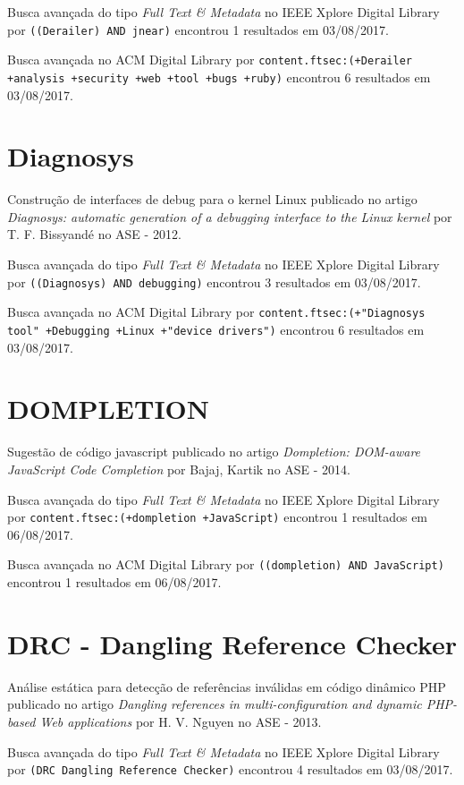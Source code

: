 Busca avançada do tipo {\it Full Text \& Metadata} no IEEE Xplore Digital Library por
\texttt{((Derailer) AND jnear)}
encontrou
1 resultados em
03/08/2017.

Busca avançada no ACM Digital Library por
\texttt{content.ftsec:(+Derailer +analysis +security +web +tool +bugs +ruby)}
encontrou
6 resultados em
03/08/2017.

\section{Diagnosys}

Construção de interfaces de debug para o kernel Linux
publicado no artigo
{\it Diagnosys: automatic generation of a debugging interface to the Linux kernel}
por
T. F. Bissyandé
no
ASE
-
2012.

Busca avançada do tipo {\it Full Text \& Metadata} no IEEE Xplore Digital Library por
\texttt{((Diagnosys) AND debugging)}
encontrou
3 resultados em
03/08/2017.

Busca avançada no ACM Digital Library por
\texttt{content.ftsec:(+"Diagnosys tool" +Debugging +Linux +"device drivers")}
encontrou
6 resultados em
03/08/2017.

\section{DOMPLETION}

Sugestão de código javascript
publicado no artigo
{\it Dompletion: DOM-aware JavaScript Code Completion}
por
Bajaj, Kartik
no
ASE
-
2014.

Busca avançada do tipo {\it Full Text \& Metadata} no IEEE Xplore Digital Library por
\texttt{content.ftsec:(+dompletion +JavaScript)}
encontrou
1 resultados em
06/08/2017.

Busca avançada no ACM Digital Library por
\texttt{((dompletion) AND JavaScript)}
encontrou
1 resultados em
06/08/2017.

\section{DRC - Dangling Reference Checker}

Análise estática para detecção de referências inválidas em código dinâmico PHP
publicado no artigo
{\it Dangling references in multi-configuration and dynamic PHP-based Web applications}
por
H. V. Nguyen
no
ASE
-
2013.

Busca avançada do tipo {\it Full Text \& Metadata} no IEEE Xplore Digital Library por
\texttt{(DRC Dangling Reference Checker)}
encontrou
4 resultados em
03/08/2017.

